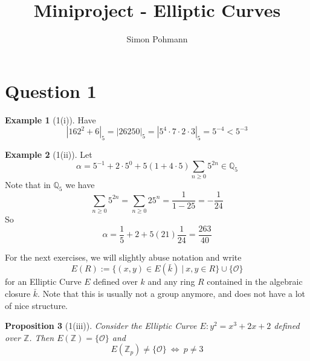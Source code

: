 \documentclass{scrartcl}
\title{Miniproject - Elliptic Curves}
\author{Simon Pohmann}
\newcommand{\Z}{\mathbb{Z}}
\newcommand{\Q}{\mathbb{Q}}
\renewcommand{\O}{\mathcal{O}}
\newtheorem{prop}{Proposition}
\theoremstyle{definition}
\newtheorem{example}[prop]{Example}
\begin{document}
\maketitle

\section{Question 1}

\begin{example}[1(i)]
    Have
    \begin{equation*}
        |162^2 + 6|_5 = |26250|_5 = |5^4 \cdot 7 \cdot 2 \cdot 3|_5 = 5^{-4} < 5^{-3}
    \end{equation*}
\end{example}

\begin{example}[1(ii)]
    Let
    \begin{equation*}
        \alpha = 5^{-1} + 2 \cdot 5^0 + 5 (1 + 4 \cdot 5) \sum_{n \geq 0} 5^{2n} \in \Q_5
    \end{equation*}
    Note that in $\Q_5$ we have
    \begin{equation*}
        \sum_{n \geq 0} 5^{2n} = \sum_{n \geq 0} 25^n = \frac 1 {1 - 25} = -\frac 1 {24}
    \end{equation*}
    So
    \begin{equation*}
        \alpha = \frac 1 5 + 2 + 5 (21) \frac 1 {24} = \frac {263} {40}
    \end{equation*}
\end{example}
For the next exercises, we will slightly abuse notation and write
\begin{equation*}
    E(R) := \{ (x, y) \in E(\bar{k}) \ | \ x, y \in R \} \cup \{\O\}
\end{equation*}
for an Elliptic Curve $E$ defined over $k$ and any ring $R$ contained in the algebraic closure $\bar{k}$.
Note that this is usually not a group anymore, and does not have a lot of nice structure.
\begin{prop}[1(iii)]
    Consider the Elliptic Curve $E: y^2 = x^3 + 2x + 2$ defined over $\Z$.
    Then $E(\Z) = \{ \O \}$ and
    \begin{equation*}
        E(\Z_p) \neq \{ \O \} \ \Leftrightarrow \ p \neq 3
    \end{equation*}
\end{prop}
\end{document}
